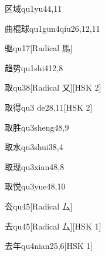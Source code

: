 \begin{entry}{区域}{qu1yu4}{4,11}
\end{entry}

\begin{entry}{曲棍球}{qu1gun4qiu2}{6,12,11}
\end{entry}

\begin{entry}{驱}{qu1}{7}[Radical 馬]
\end{entry}

\begin{entry}{趋势}{qu1shi4}{12,8}
\end{entry}

\begin{entry}{取}{qu3}{8}[Radical 又][HSK 2]
\end{entry}

\begin{entry}{取得}{qu3 de2}{8,11}[HSK 2]
\end{entry}

\begin{entry}{取胜}{qu3sheng4}{8,9}
\end{entry}

\begin{entry}{取水}{qu3shui3}{8,4}
\end{entry}

\begin{entry}{取现}{qu3xian4}{8,8}
\end{entry}

\begin{entry}{取悦}{qu3yue4}{8,10}
\end{entry}

\begin{entry}{厺}{qu4}{5}[Radical 厶]
\end{entry}

\begin{entry}{去}{qu4}{5}[Radical 厶][HSK 1]
\end{entry}

\begin{entry}{去年}{qu4nian2}{5,6}[HSK 1]
\end{entry}


